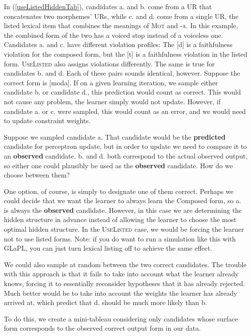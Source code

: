\documentclass[12]{article}
\begin{document}
	  
	  In (\ref{useListedHiddenTab}), candidates a. and b. come from a UR that concatenates two morphemes' URs, while c. and d. come from a single UR, the listed lexical item that combines the meanings of \textsc{Mot} and \textsc{-a}.  In this example, the combined form of the two has a voiced stop instead of a voiceless one.  Candidates a. and c. have different violation profiles: The [d] is a faithfulness violation for the composed form, but the [t] is a faithfulness violation in the listed form.  \textsc{UseListed} also assigns violations differently.  The same is true for candidates b. and d.  Each of these pairs sounds identical, however.  Suppose the correct form is [moda].  If on a given learning iteration, we sample either candidate b. or candidate d., this prediction would count as correct.  This would not cause any problem, the learner simply would not update.  However, if candidate a. or c. were sampled, this would count as an error, and we would need to update constraint weights.
	  
	  Suppose we sampled candidate a.  That candidate would be the {\bf predicted} candidate for perceptron update, but in order to update we need to compare it to an {\bf observed} candidate.  b. and d. both correspond to the actual observed output, so either one could plausibly be used as the {\bf observed} candidate.  How do we choose between them?
	  
	  One option, of course, is simply to designate one of them correct.  Perhaps we could decide that we want the learner to always learn the Composed form, so a. is always the {\bf observed} candidate.  However, in this case we are determining the hidden structure in advance instead of allowing the learner to choose the most optimal hidden structure.  In the \textsc{UseListed} case, we would be forcing the learner not to use listed forms.  Note: if you do want to run a simulation like this with GLaPL, you can just turn lexical listing off to achieve the same effect.
	  
	  We could also sample at random between the two correct candidates.  The trouble with this approach is that it fails to take into account what the learner already knows, forcing it to essentially reconsider hypotheses that it has already rejected.  Much better would be to take into account the weights the learner has already arrived at, which predict that d. should be much more likely than b.
	  
	  To do this, we create a mini-tableau considering only candidates whose surface form corresponds to the observed correct output form in our data.
	  
\end{document}
